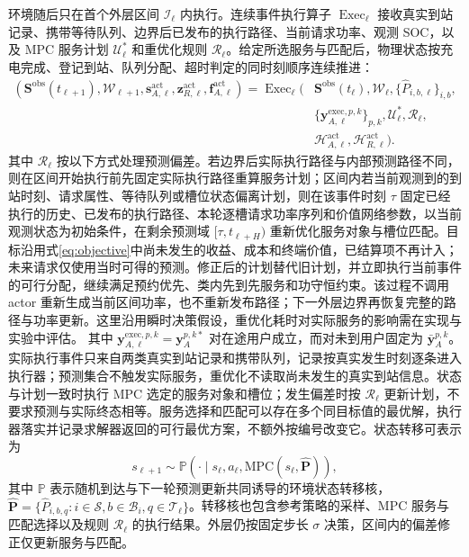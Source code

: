 \documentclass[12pt,a4paper,UTF8]{ctexart}
\begin{document}
环境随后只在首个外层区间 $\mathcal I_\ell$ 内执行。连续事件执行算子 $\operatorname{Exec}_\ell$ 接收真实到站记录、携带等待队列、边界后已发布的执行路径、当前请求功率、观测 SOC，以及 MPC 服务计划 $\mathcal U_\ell^*$ 和重优化规则 $\mathcal R_\ell$。给定所选服务与匹配后，物理状态按充电完成、登记到站、队列分配、超时判定的同时刻顺序连续推进：
\begin{equation}
\begin{aligned}
(\mathbf S^{\mathrm{obs}}(t_{\ell+1}),\mathcal W_{\ell+1},
\mathbf s_{A,\ell}^{\mathrm{act}},\mathbf z_{R,\ell}^{\mathrm{act}},
\mathbf f_{A,\ell}^{\mathrm{act}})
=\operatorname{Exec}_\ell\!\Big(&
\mathbf S^{\mathrm{obs}}(t_\ell),\mathcal W_\ell,
\{\widehat P_{i,b,\ell}\}_{i,b},\\
&\{\mathbf y_{A,\ell}^{\mathrm{exec},p,k}\}_{p,k},
\mathcal U_\ell^*,\mathcal R_\ell,\\
&\mathcal H_{A,\ell}^{\mathrm{act}},\mathcal H_{R,\ell}^{\mathrm{act}}
\Big).
\end{aligned}
\label{eq:actual_execution_operator}
\end{equation}
其中 $\mathcal R_\ell$ 按以下方式处理预测偏差。若边界后实际执行路径与内部预测路径不同，则在区间开始执行前先固定实际执行路径重算服务计划；区间内若当前观测到的到站时刻、请求属性、等待队列或槽位状态偏离计划，则在该事件时刻 $\tau$ 固定已经执行的历史、已发布的执行路径、本轮逐槽请求功率序列和价值网络参数，以当前观测状态为初始条件，在剩余预测域 $[\tau,t_{\ell+H})$ 重新优化服务对象与槽位匹配。目标沿用式\eqref{eq:objective}中尚未发生的收益、成本和终端价值，已结算项不再计入；未来请求仅使用当时可得的预测。修正后的计划替代旧计划，并立即执行当前事件的可行分配，继续满足预约优先、类内先到先服务和功守恒约束。该过程不调用 actor 重新生成当前区间功率，也不重新发布路径；下一外层边界再恢复完整的路径与功率更新。这里沿用瞬时决策假设，重优化耗时对实际服务的影响需在实现与实验中评估。
其中 $\mathbf y_{A,\ell}^{\mathrm{exec},p,k}=\mathbf y_A^{p,k*}$ 对在途用户成立，而对未到用户固定为 $\bar{\mathbf y}_{A}^{p,k}$。实际执行事件只来自两类真实到站记录和携带队列，记录按真实发生时刻逐条进入执行器；预测集合不触发实际服务，重优化不读取尚未发生的真实到站信息。状态与计划一致时执行 MPC 选定的服务对象和槽位；发生偏差时按 $\mathcal R_\ell$ 更新计划，不要求预测与实际终态相等。服务选择和匹配可以存在多个同目标值的最优解，执行器落实并记录求解器返回的可行最优方案，不额外按编号改变它。状态转移可表示为
\begin{equation}
s_{\ell+1}
\sim
\mathbb P\!\left(
\cdot\mid
s_\ell,a_\ell,
\mathrm{MPC}(s_\ell,\widehat{\mathbf P})
\right),
\label{eq:rl_transition}
\end{equation}
其中 $\mathbb P$ 表示随机到达与下一轮预测更新共同诱导的环境状态转移核，$\widehat{\mathbf P}=\{\widehat P_{i,b,q}:i\in\mathcal S,b\in\mathcal B_i,q\in\mathcal T_\ell\}$。转移核也包含参考策略的采样、MPC 服务与匹配选择以及规则 $\mathcal R_\ell$ 的执行结果。外层仍按固定步长 $\sigma$ 决策，区间内的偏差修正仅更新服务与匹配。
\end{document}
